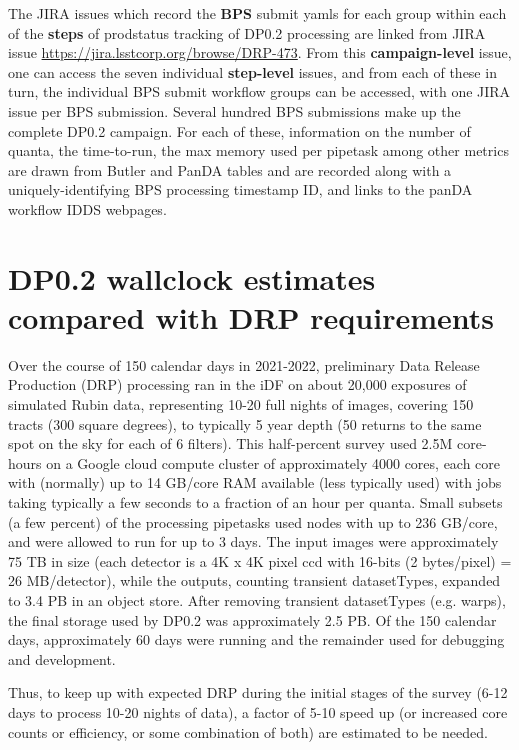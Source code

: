 \documentclass[OPS,authoryear,toc]{lsstdoc}
\begin{document}
The JIRA issues which record the {\bf BPS} submit yamls for each group
within each of the {\bf steps} of {\rm prodstatus} tracking of DP0.2
processing are linked from JIRA issue
\url{https://jira.lsstcorp.org/browse/DRP-473}.  From this 
{\bf campaign-level} issue, one can access the seven individual {\bf step-level}
issues, and from each of these in turn, the individual BPS submit
workflow groups can be accessed, with one JIRA issue per BPS submission. 
Several hundred BPS submissions make up the complete DP0.2 campaign.
For each of these, information on the number of quanta, 
the time-to-run, the max memory used per pipetask among 
other metrics are drawn from Butler and PanDA tables and are 
recorded along with a uniquely-identifying BPS processing timestamp ID, 
and links to the panDA workflow IDDS webpages.

\section{DP0.2 wallclock estimates compared with DRP requirements}

Over the course of 150 calendar days in 2021-2022, preliminary Data
Release Production (DRP) processing ran in the iDF on about 20,000
exposures of simulated Rubin data, representing 10-20 full nights of
images, covering 150 tracts (300 square degrees), to typically 5 year
depth (50 returns to the same spot on the sky for each of 6 filters).
This half-percent survey used 2.5M core-hours on a Google cloud compute 
cluster of approximately 4000 cores, each core with (normally) up 
to 14 GB/core RAM available (less typically used) with jobs 
taking typically a few seconds to a fraction of an hour per quanta.  
Small subsets (a few percent) of the processing pipetasks used nodes 
with up to 236 GB/core, and were allowed to run for up to 3 days.  
The input images were approximately 75 TB in size (each detector is a 4K x 4K pixel ccd with 16-bits (2 bytes/pixel) = 26 MB/detector), while the outputs, 
counting transient datasetTypes, expanded to 3.4 PB in an object store.  
After removing transient datasetTypes (e.g. warps), the final storage 
used by DP0.2 was approximately 2.5 PB.  Of the 150 calendar days, 
approximately 60 days were running and the remainder used for 
debugging and development.

Thus, to keep up with expected DRP during the initial stages of the survey
(6-12 days to process 10-20 nights of data), a factor of 5-10 speed up
(or increased core counts or efficiency, or some combination of both) 
are estimated to be needed.   
\end{document}
